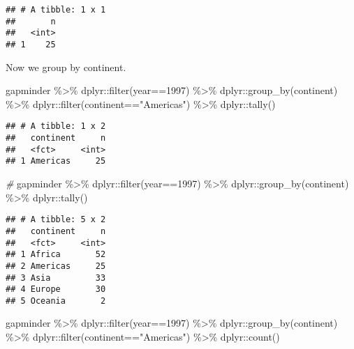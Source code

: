 \documentclass[
]{book}
\newenvironment{Shaded}{\begin{snugshade}}{\end{snugshade}}
\newcommand{\CommentTok}[1]{\textcolor[rgb]{0.56,0.35,0.01}{\textit{#1}}}
\newcommand{\DecValTok}[1]{\textcolor[rgb]{0.00,0.00,0.81}{#1}}
\newcommand{\FunctionTok}[1]{\textcolor[rgb]{0.00,0.00,0.00}{#1}}
\newcommand{\NormalTok}[1]{#1}
\newcommand{\SpecialCharTok}[1]{\textcolor[rgb]{0.00,0.00,0.00}{#1}}
\newcommand{\StringTok}[1]{\textcolor[rgb]{0.31,0.60,0.02}{#1}}
\begin{document}
\begin{verbatim}
## # A tibble: 1 x 1
##       n
##   <int>
## 1    25
\end{verbatim}

Now we group by continent.

\begin{Shaded}
\begin{Highlighting}[]
\NormalTok{gapminder }\SpecialCharTok{\%\textgreater{}\%} 
\NormalTok{  dplyr}\SpecialCharTok{::}\FunctionTok{filter}\NormalTok{(year}\SpecialCharTok{==}\DecValTok{1997}\NormalTok{) }\SpecialCharTok{\%\textgreater{}\%}
\NormalTok{  dplyr}\SpecialCharTok{::}\FunctionTok{group\_by}\NormalTok{(continent) }\SpecialCharTok{\%\textgreater{}\%}
\NormalTok{  dplyr}\SpecialCharTok{::}\FunctionTok{filter}\NormalTok{(continent}\SpecialCharTok{==}\StringTok{"Americas"}\NormalTok{) }\SpecialCharTok{\%\textgreater{}\%}
\NormalTok{  dplyr}\SpecialCharTok{::}\FunctionTok{tally}\NormalTok{()}
\end{Highlighting}
\end{Shaded}

\begin{verbatim}
## # A tibble: 1 x 2
##   continent     n
##   <fct>     <int>
## 1 Americas     25
\end{verbatim}

\begin{Shaded}
\begin{Highlighting}[]
\CommentTok{\#}
\NormalTok{gapminder }\SpecialCharTok{\%\textgreater{}\%} 
\NormalTok{  dplyr}\SpecialCharTok{::}\FunctionTok{filter}\NormalTok{(year}\SpecialCharTok{==}\DecValTok{1997}\NormalTok{) }\SpecialCharTok{\%\textgreater{}\%}
\NormalTok{  dplyr}\SpecialCharTok{::}\FunctionTok{group\_by}\NormalTok{(continent) }\SpecialCharTok{\%\textgreater{}\%}
\NormalTok{  dplyr}\SpecialCharTok{::}\FunctionTok{tally}\NormalTok{()}
\end{Highlighting}
\end{Shaded}

\begin{verbatim}
## # A tibble: 5 x 2
##   continent     n
##   <fct>     <int>
## 1 Africa       52
## 2 Americas     25
## 3 Asia         33
## 4 Europe       30
## 5 Oceania       2
\end{verbatim}

\begin{Shaded}
\begin{Highlighting}[]
\NormalTok{gapminder }\SpecialCharTok{\%\textgreater{}\%} 
\NormalTok{  dplyr}\SpecialCharTok{::}\FunctionTok{filter}\NormalTok{(year}\SpecialCharTok{==}\DecValTok{1997}\NormalTok{) }\SpecialCharTok{\%\textgreater{}\%}
\NormalTok{  dplyr}\SpecialCharTok{::}\FunctionTok{group\_by}\NormalTok{(continent) }\SpecialCharTok{\%\textgreater{}\%}
\NormalTok{  dplyr}\SpecialCharTok{::}\FunctionTok{filter}\NormalTok{(continent}\SpecialCharTok{==}\StringTok{"Americas"}\NormalTok{) }\SpecialCharTok{\%\textgreater{}\%}
\NormalTok{  dplyr}\SpecialCharTok{::}\FunctionTok{count}\NormalTok{()}
\end{Highlighting}
\end{Shaded}
\end{document}
